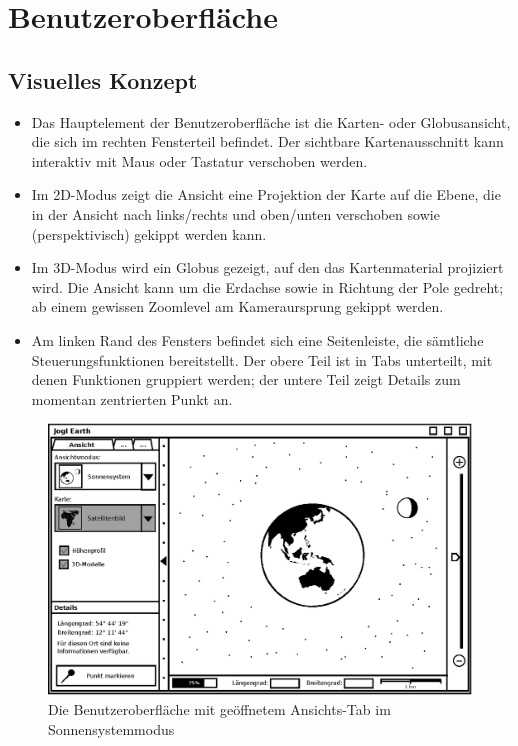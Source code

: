 \documentclass[10pt]{scrreprt}
\begin{document}
\chapter{Benutzeroberfläche}

\section{Visuelles Konzept}

\begin{itemize}
	\item Das Hauptelement der Benutzeroberfläche ist die Karten- oder Globusansicht, die sich im rechten Fensterteil befindet. Der sichtbare Kartenausschnitt kann interaktiv mit Maus oder Tastatur verschoben werden.
	\item Im 2D-Modus zeigt die Ansicht eine Projektion der Karte auf die Ebene, die in der Ansicht nach links/rechts und oben/unten verschoben sowie (perspektivisch) gekippt werden kann.
	\item Im 3D-Modus wird ein Globus gezeigt, auf den das Kartenmaterial projiziert wird. Die Ansicht kann um die Erdachse sowie in Richtung der Pole gedreht; ab einem gewissen Zoomlevel am Kameraursprung gekippt werden.
	\item Am linken Rand des Fensters befindet sich eine Seitenleiste, die sämtliche Steuerungsfunktionen bereitstellt. Der obere Teil ist in Tabs unterteilt, mit denen Funktionen gruppiert werden; der untere Teil zeigt Details zum momentan zentrierten Punkt an.
\end{itemize}


\vspace{1cm}
\begin{figure}[h]
	\centering
	\includegraphics[scale=0.9]{GUI-Sonnensystem.eps}
	\caption{Die Benutzeroberfläche mit geöffnetem Ansichts-Tab im Sonnensystemmodus}
\end{figure}
\end{document}
